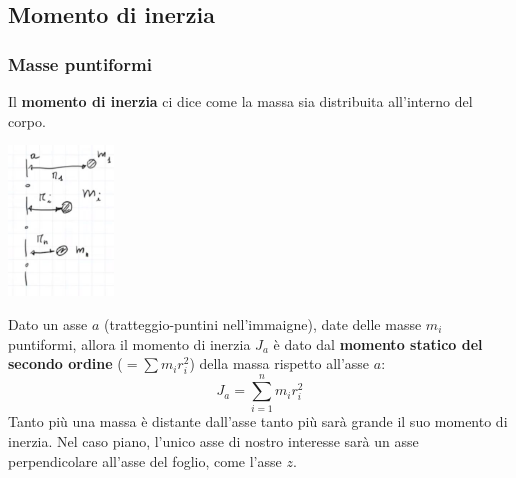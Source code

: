 \subsection{Momento di inerzia}
\subsubsection{Masse puntiformi}
Il \textbf{momento di inerzia} ci dice come la massa sia distribuita all'interno del corpo.\newline
{}
\begin{center}
    \includegraphics[height=4cm]{../lezione8/img3.JPG}
\end{center}
Dato un asse $a$ (tratteggio-puntini nell'immaigne), date delle masse $m_i$ puntiformi, allora il momento di inerzia $J_a$ è dato dal \textbf{momento statico del secondo ordine} ($= \sum m_i r_i^2$)  della massa rispetto all'asse $a$:
\[
    J_a = \sum_{i=1}^{n} m_i r_i^2
\]
Tanto più una massa è distante dall'asse tanto più sarà grande il suo momento di inerzia.\newline
\newline
Nel caso piano, l'unico asse di nostro interesse sarà un asse perpendicolare all'asse del foglio, come l'asse $z$.
